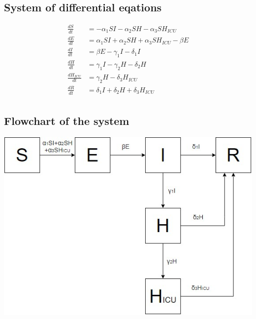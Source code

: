 \documentclass[11pt]{article}
\begin{document}
\subsection{System of differential eqations}
\begin{equation}
\begin{aligned}
\frac{dS}{dt}&=- \alpha_1 SI - \alpha_2 SH - \alpha_3 SH_{ICU} \\
\frac{dE}{dt}&= \alpha_1 SI + \alpha_2 SH + \alpha_3 SH_{ICU} - \beta E \\
\frac{dI}{dt}&= \beta E -\gamma_1 I -\delta_1 I \\
\frac{dH}{dt}&= \gamma_1 I - \gamma_2 H -\delta_2 H \\
\frac{dH_{ICU}}{dt}&= \gamma_2 H -\delta_3 H_{ICU} \\
\frac{dR}{dt}&=\delta_1 I + \delta_2 H + \delta_3 H_{ICU} \\
\end{aligned}
\end{equation} 
\subsection{Flowchart of the system}
\begin{center}
\includegraphics[width=1\textwidth]{SEIHR.jpg} 
\end{center}
\end{document}
